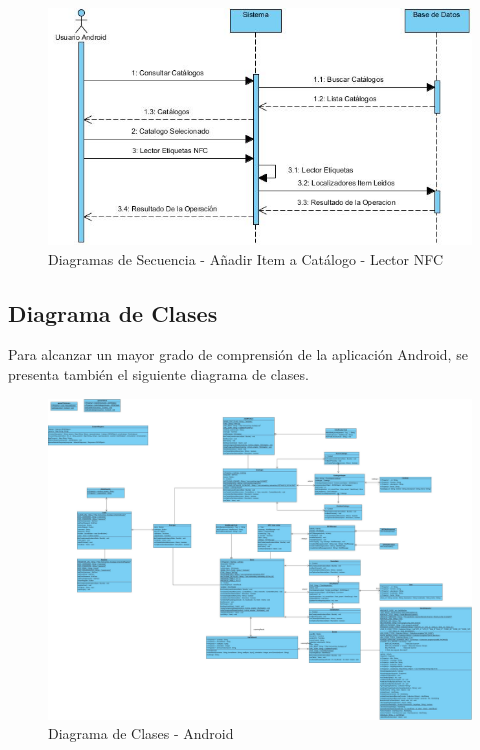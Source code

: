 \documentclass[a4paper,11pt]{book}
\begin{document}
\begin{figure}[H] 
\centering 
\includegraphics[scale=0.50]{imagenes/secuencia/android/add_item_nfc.jpg}
\caption{ Diagramas de Secuencia - Añadir Item a Catálogo - Lector NFC\cite{diagrama}  }  
\end{figure}



\subsection{Diagrama de Clases}
Para alcanzar un mayor grado de comprensión de la aplicación Android, se presenta también el siguiente diagrama de clases. 
\begin{figure}[H] 
\centering 
\includegraphics[scale=0.15]{imagenes/clases/clasesAndroid.jpg}
\caption{ Diagrama de Clases - Android\cite{propio}  }  
\end{figure}
\end{document}
